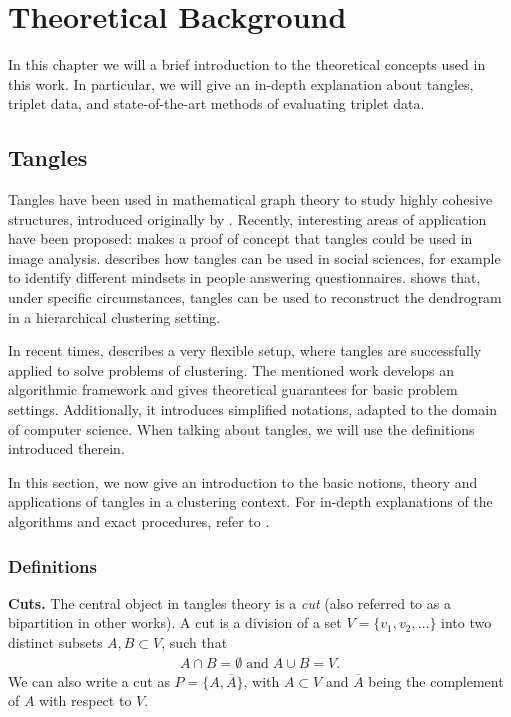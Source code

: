 \chapter{Theoretical Background}\label{theory}
In this chapter we will a brief introduction to the theoretical concepts used in this work. 
In particular, we will give an in-depth explanation about tangles, triplet data, and state-of-the-art methods of evaluating triplet data.

\section{Tangles}\label{theory:tangles}
Tangles have been used in mathematical graph theory to study highly cohesive structures, 
introduced originally by \cite{robertsonGraphMinorsObstructions1991}. 
Recently, interesting areas of application have been proposed:
\cite{diestelTanglesMonaLisa2017} makes a proof of concept that tangles could 
be used in image analysis.
\cite{diestelTanglesSocialSciences2019} describes how tangles can be used in social sciences, for 
example to identify different mindsets in people answering questionnaires.
\cite{Fluck2019} shows that, under specific circumstances, tangles can be
used to reconstruct the dendrogram in a hierarchical clustering setting. 

In recent times, \cite{klepperClusteringTanglesAlgorithmic2021} describes a very flexible setup,
where tangles are successfully applied to solve problems of clustering. 
The mentioned work develops an algorithmic framework and gives theoretical guarantees for 
basic problem settings.
Additionally, it introduces simplified notations, adapted to the domain of computer science. 
When talking about tangles, we will use the definitions introduced therein. 

In this section, we now give an introduction to the basic notions, theory and applications of tangles in a clustering context.
For in-depth explanations of the algorithms and exact procedures, refer to 
\cite{klepperClusteringTanglesAlgorithmic2021}.


\subsection{Definitions}
\textbf{Cuts.} The central object in tangles theory is a \textit{cut} (also referred to as a bipartition in other works). 
A cut is a division of a set $V =  \{ v_1, v_2, \ldots \}$ into two distinct subsets $A, B \subset V$, such that
\begin{align*}
A \cap B = \emptyset\;\text{and}\;A \cup B = V.
\end{align*}
We can also write a cut as $P = \{A, \overline{A}\}$, with $A \subset V$ and $\overline{A}$ being the
complement of $A$ with respect to $V$. \\

